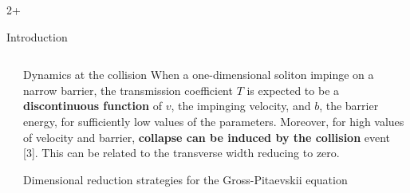 \documentclass[final]{beamer}
\newlength{\sepwidth}
\newlength{\colwidth}
\newcommand{\separatorcolumn}{\begin{column}{\sepwidth}\end{column}}
\begin{document}
\begin{frame}[t]
\begin{columns}[t]
\begin{column}{2\colwidth+\sepwidth}
\begin{block}{Introduction}
  \end{block}
  \end{column}
  \end{columns}


  \begin{columns}[t]
    \separatorcolumn
    \begin{column}{\colwidth}
      
      \begin{block}{Dynamics at the collision}
        When a one-dimensional soliton impinge on a narrow barrier, the transmission coefficient $T$ is expected to be a \textbf{discontinuous function} of $v$, the impinging velocity, and $b$, the barrier energy, for sufficiently low values of the parameters. Moreover, for high values of velocity and barrier, \textbf{collapse can be induced by the collision} event [3]. This can be related to the transverse width reducing to zero.  
        \begin{figure}
          \hspace{2cm}
      \end{figure}
      \end{block}

      \begin{exampleblock}{Dimensional reduction strategies for the Gross-Pitaevskii equation}{}
        

\end{exampleblock}
\end{column}
\end{columns}
\end{frame}
\end{document}
